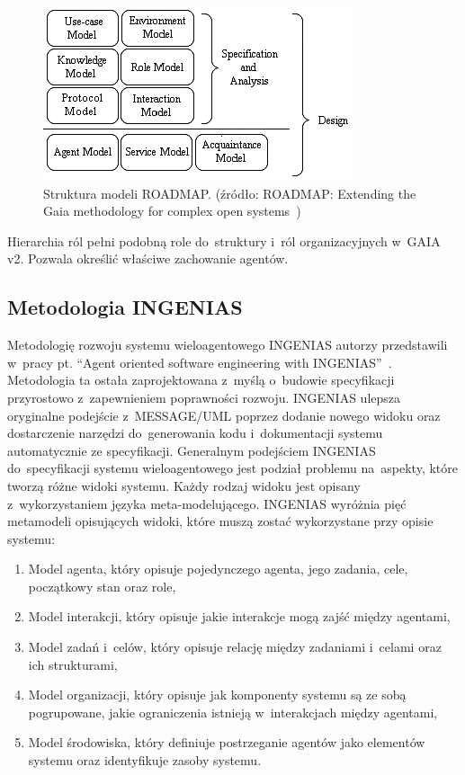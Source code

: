 \documentclass[11pt]{report}
\begin{document}
    \begin{figure}[!ht]
        \centering
        \includegraphics[width=\linewidth]{fig/roadmap models.png}
        \caption{Struktura modeli ROADMAP. (źródło: ROADMAP: Extending the Gaia methodology for complex open systems~\cite{Juan2002a})}
        \label{fig:roadmap}
    \end{figure}

    Hierarchia ról pełni podobną role do~struktury i~ról organizacyjnych w~GAIA v2.
    Pozwala określić właściwe zachowanie agentów.

    \subsection{Metodologia INGENIAS}
    Metodologię rozwoju systemu wieloagentowego INGENIAS autorzy przedstawili w~pracy pt. ``Agent oriented software engineering with INGENIAS''~\cite{Pavon2003}.
    Metodologia ta ostała zaprojektowana z~myślą o~budowie specyfikacji przyrostowo z~zapewnieniem poprawności rozwoju.
    INGENIAS ulepsza oryginalne podejście z~MESSAGE/UML poprzez dodanie nowego widoku oraz dostarczenie narzędzi do~generowania kodu i~dokumentacji systemu automatycznie ze specyfikacji.
    Generalnym podejściem INGENIAS do~specyfikacji systemu wieloagentowego jest podział problemu na~aspekty, które tworzą różne widoki systemu.
    Każdy rodzaj widoku jest opisany z~wykorzystaniem języka meta-modelującego.
    INGENIAS wyróżnia pięć metamodeli opisujących widoki, które muszą zostać wykorzystane przy opisie systemu:
    \begin{enumerate}
        \item Model agenta, który opisuje pojedynczego agenta, jego zadania, cele, początkowy stan oraz role,
        \item Model interakcji, który opisuje jakie interakcje mogą zajść między agentami,
        \item Model zadań i~celów, który opisuje relację między zadaniami i~celami oraz ich strukturami,
        \item Model organizacji, który opisuje jak komponenty systemu są ze sobą pogrupowane, jakie ograniczenia istnieją w~interakcjach między agentami,
        \item Model środowiska, który definiuje postrzeganie agentów jako elementów systemu oraz identyfikuje zasoby systemu.
    \end{enumerate}
\end{document}
